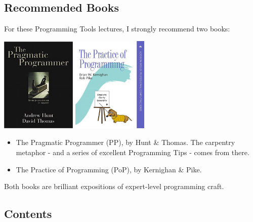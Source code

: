 \documentclass[handout]{beamer}
\begin{document}
\subsection{Recommended Books}

\begin{frame}

For these Programming Tools lectures, I strongly recommend two books:

\begin{center}
	\includegraphics[width=0.27\textwidth]{tpp}
	\hspace{2cm}
	\includegraphics[width=0.27\textwidth]{tpop}
\end{center}

    \begin{itemize}
    \item
    \alert{The Pragmatic Programmer (PP)}, by \alert{Hunt \& Thomas}.
    The carpentry metaphor - and a series of excellent Programming Tips -
    comes from there.

    \pause
    \item
    \alert{The Practice of Programming (PoP)}, by \alert{Kernighan \& Pike}.

    \end{itemize}

    Both books are brilliant expositions of expert-level
    programming craft.
\end{frame}

\subsection{Contents}
\end{document}
